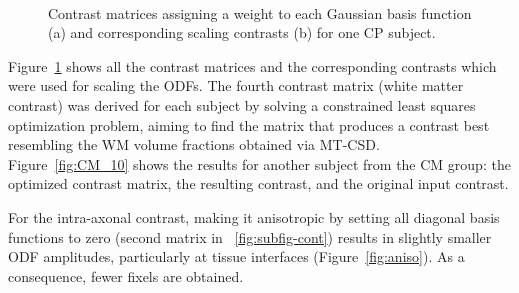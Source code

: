 \begin{figure}[H]
    \centering
     \\ %
    \caption{Contrast matrices assigning a weight to each Gaussian basis function (a) and corresponding scaling contrasts (b) for one CP subject.}
    \label{fig:contrast_combined}
\end{figure}



Figure~\ref{fig:contrast_combined} shows all the contrast matrices and the corresponding contrasts which were used for scaling the ODFs. The fourth contrast matrix (white matter contrast) was derived for each subject by solving a constrained least squares optimization problem, aiming to find the matrix that produces a contrast best resembling the WM volume fractions obtained via MT-CSD.\\
Figure~\ref{fig:CM_10} shows the results for another subject from the CM group: the optimized contrast matrix, the resulting contrast, and the original input contrast.

For the intra-axonal contrast, making it anisotropic by setting all diagonal basis functions to zero (second matrix in ~\ref{fig:subfig-cont}) results in slightly smaller ODF amplitudes, particularly at tissue interfaces (Figure~\ref{fig:aniso}). As a consequence, fewer fixels are obtained.

